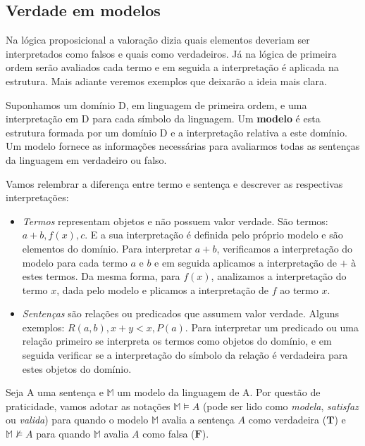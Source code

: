     \subsection{Verdade em modelos}
    
     
    Na lógica proposicional a valoração dizia quais elementos deveriam ser interpretados como falsos e quais como verdadeiros. Já na lógica de primeira ordem serão avaliados cada termo e em seguida a interpretação é aplicada na estrutura. Mais adiante veremos exemplos que deixarão a ideia mais clara.
    
    Suponhamos um domínio D, em linguagem de primeira ordem, e uma interpretação em D para cada símbolo da linguagem. Um \textbf{modelo} é esta estrutura formada por um domínio D e a interpretação relativa a este domínio. Um modelo fornece as informações necessárias para avaliarmos todas as sentenças da linguagem em verdadeiro ou falso.
    
    Vamos relembrar a diferença entre termo e sentença e descrever as respectivas interpretações:
    
    \begin{itemize}
        \item  \textit{Termos} representam objetos e não possuem valor verdade. São termos: $a + b, f(x), c$. E a sua interpretação é definida pelo próprio modelo e são elementos do domínio. Para interpretar $a + b$, verificamos a interpretação do modelo para cada termo $a$ e $b$ e em seguida aplicamos a interpretação de $+$ à estes termos. Da mesma forma, para $f(x)$, analizamos a interpretação do termo $x$, dada pelo modelo e plicamos a interpretação de $f$ ao termo $x$.
        
        \item \textit{Sentenças} são relações ou predicados que assumem valor verdade. Alguns exemplos: $ R(a,b), x + y < x, P(a)$. Para interpretar um predicado ou uma relação primeiro se interpreta os termos como objetos do domínio, e em seguida verificar se a interpretação do símbolo da relação é verdadeira para estes objetos do domínio.
        
        
    \end{itemize}
    
    Seja A uma sentença e $\mathbb{M}$ um modelo da linguagem de A. Por questão de praticidade, vamos adotar as notações $\mathbb{M} \vDash A$ (pode ser lido como \textit{modela}, \textit{satisfaz} ou \textit{valida}) para quando o modelo $\mathbb{M}$ avalia a sentença $A$ como verdadeira ($ \textbf{T}$) e $\mathbb{M} \not \vDash A$ para quando $\mathbb{M}$ avalia $A$ como falsa ($ \textbf{F}$).
    
